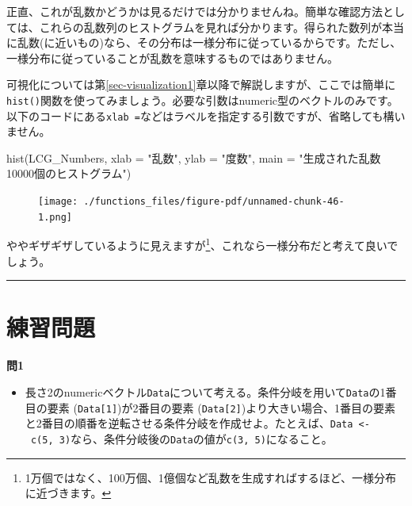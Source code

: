 \documentclass[
  a4paper,
  pandoc,
  ja=standard,
  jafont=haranoaji]{bxjsbook}
\newenvironment{Shaded}{\begin{snugshade}}{\end{snugshade}}
\newcommand{\AttributeTok}[1]{\textcolor[rgb]{0.00,0.48,0.65}{#1}}
\newcommand{\FunctionTok}[1]{\textcolor[rgb]{0.28,0.35,0.67}{#1}}
\newcommand{\NormalTok}[1]{\textcolor[rgb]{0.00,0.48,0.65}{#1}}
\newcommand{\StringTok}[1]{\textcolor[rgb]{0.13,0.47,0.30}{#1}}
\providecommand{\tightlist}{%
  \setlength{\itemsep}{0pt}\setlength{\parskip}{0pt}}
\begin{document}
正直、これが乱数かどうかは見るだけでは分かりませんね。簡単な確認方法としては、これらの乱数列のヒストグラムを見れば分かります。得られた数列が本当に乱数(に近いもの)なら、その分布は一様分布に従っているからです。ただし、一様分布に従っていることが乱数を意味するものではありません。

可視化については第\ref{sec-visualization1}章以降で解説しますが、ここでは簡単に\texttt{hist()}関数を使ってみましょう。必要な引数はnumeric型のベクトルのみです。以下のコードにある\texttt{xlab\ =}などはラベルを指定する引数ですが、省略しても構いません。

\begin{Shaded}
\begin{Highlighting}[numbers=left,,]
\FunctionTok{hist}\NormalTok{(LCG\_Numbers, }\AttributeTok{xlab =} \StringTok{"乱数"}\NormalTok{, }\AttributeTok{ylab =} \StringTok{"度数"}\NormalTok{, }
     \AttributeTok{main =} \StringTok{"生成された乱数10000個のヒストグラム"}\NormalTok{)}
\end{Highlighting}
\end{Shaded}

\begin{figure}[H]

{\centering \texttt{[image: ./functions\_files/figure-pdf/unnamed-chunk-46-1.png]}

}

\end{figure}

ややギザギザしているように見えますが\footnote{1万個ではなく、100万個、1億個など乱数を生成すればするほど、一様分布に近づきます。}、これなら一様分布だと考えて良いでしょう。

\begin{center}\rule{0.5\linewidth}{0.5pt}\end{center}

\hypertarget{sec-func_exercise}{%
\section{練習問題}\label{sec-func_exercise}}

\textbf{問1}

\begin{itemize}
\tightlist
\item
  長さ2のnumericベクトル\texttt{Data}について考える。条件分岐を用いて\texttt{Data}の1番目の要素
  (\texttt{Data{[}1{]}})が2番目の要素
  (\texttt{Data{[}2{]}})より大きい場合、1番目の要素と2番目の順番を逆転させる条件分岐を作成せよ。たとえば、\texttt{Data\ \textless{}-\ c(5,\ 3)}なら、条件分岐後の\texttt{Data}の値が\texttt{c(3,\ 5)}になること。
\end{itemize}
\end{document}
